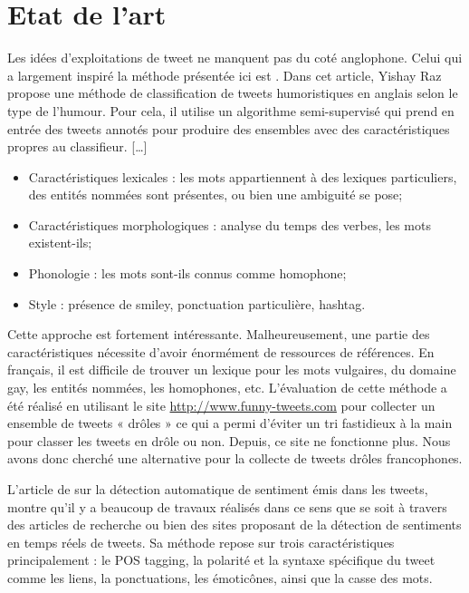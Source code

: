 \documentclass[10pt,a4paper,twoside]{article}
\begin{document}
\section{Etat de l'art}
\label{art}
Les idées d’exploitations de tweet ne manquent pas du coté anglophone. Celui qui a largement inspiré la méthode présentée ici est \cite{Raz12}.  Dans cet article, Yishay Raz propose une méthode de classification de tweets humoristiques en anglais selon le type de l’humour. Pour cela, il utilise un algorithme semi-supervisé qui prend en entrée des tweets annotés pour produire des ensembles avec des caractéristiques propres au classifieur.  […]

\begin{itemize}
\item Caractéristiques lexicales : les mots appartiennent à des lexiques particuliers, des entités nommées sont présentes, ou bien une ambiguité se pose;
\item Caractéristiques morphologiques : analyse du temps des verbes, les mots existent-ils;
\item Phonologie : les mots sont-ils connus comme homophone;
\item Style : présence de smiley, ponctuation particulière, hashtag.
\end{itemize}
Cette approche est fortement intéressante. Malheureusement, une partie des caractéristiques nécessite d’avoir énormément de ressources de références. En français, il est difficile de trouver un lexique pour les mots vulgaires, du domaine gay, les entités nommées, les homophones, etc. 
L’évaluation de cette méthode a été réalisé en utilisant le site \url{ http://www.funny-tweets.com} pour collecter un ensemble de tweets « drôles » ce qui a permi d’éviter un tri fastidieux à la main pour classer les tweets en drôle ou non. Depuis, ce site ne fonctionne plus. Nous avons donc cherché une alternative pour la collecte de tweets drôles francophones.

L’article de \cite{Barbosa2010} sur la détection automatique de sentiment émis dans les tweets, montre qu’il y a beaucoup de travaux réalisés dans ce sens que se soit à travers des articles de recherche ou bien des sites proposant de la détection de sentiments en temps réels de tweets.  Sa méthode repose sur trois caractéristiques principalement : le POS tagging, la polarité et la syntaxe spécifique du tweet comme les liens, la ponctuations, les émoticônes, ainsi que la casse des mots. 
\end{document}
